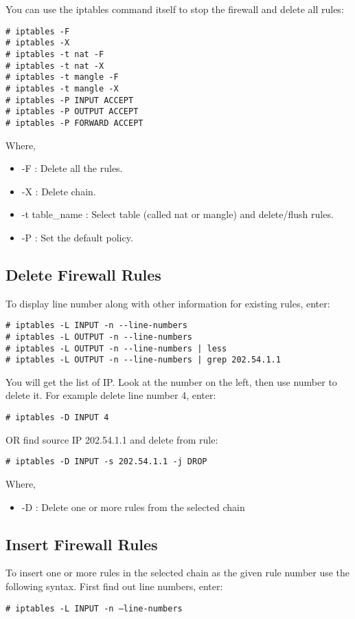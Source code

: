 \documentclass[dvipdfm]{book}
\begin{document}
You can use the iptables command itself to stop the firewall 
and delete all rules:
\begin{verbatim}
# iptables -F
# iptables -X
# iptables -t nat -F
# iptables -t nat -X
# iptables -t mangle -F
# iptables -t mangle -X
# iptables -P INPUT ACCEPT
# iptables -P OUTPUT ACCEPT
# iptables -P FORWARD ACCEPT
\end{verbatim}

Where,
\begin{itemize}
\item -F : Delete all the rules.
\item -X : Delete chain.
\item -t table\_name : Select table (called nat or mangle) 
and delete/flush rules.
\item -P : Set the default policy.
\end{itemize}

\subsection{Delete Firewall Rules}

To display line number along with other information for existing rules, enter:
\begin{verbatim}
# iptables -L INPUT -n --line-numbers
# iptables -L OUTPUT -n --line-numbers
# iptables -L OUTPUT -n --line-numbers | less
# iptables -L OUTPUT -n --line-numbers | grep 202.54.1.1
\end{verbatim}

You will get the list of IP. Look at the number on the left, then use 
number to delete it. For example delete line number 4, enter:
\begin{verbatim}
# iptables -D INPUT 4
\end{verbatim}

OR find source IP 202.54.1.1 and delete from rule:
\begin{verbatim}
# iptables -D INPUT -s 202.54.1.1 -j DROP
\end{verbatim}
Where,
\begin{itemize}
\item -D : Delete one or more rules from the selected chain
\end{itemize}

\subsection{Insert Firewall Rules}

To insert one or more rules in the selected chain as the given rule 
number use the following syntax. First find out line numbers, enter:
\begin{verbatim}
# iptables -L INPUT -n –line-numbers
\end{verbatim}
\end{document}
